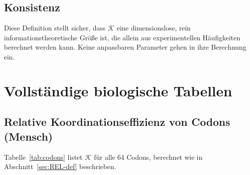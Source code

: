\documentclass[12pt,a4paper]{article}
\newcommand{\REL}{\mathcal{K}}          %
\begin{document}
	\subsection{Konsistenz}
	Diese Definition stellt sicher, dass \(\REL\) eine dimensionslose, rein informationstheoretische Größe ist, die allein aus experimentellen Häufigkeiten berechnet werden kann. Keine anpassbaren Parameter gehen in ihre Berechnung ein.
	
	\section{Vollständige biologische Tabellen}
	\label{sec:tables}
	
	\subsection{Relative Koordinationseffizienz von Codons (Mensch)}
	\label{sec:codons}
	Tabelle~\ref{tab:codons} listet \(\REL\) für alle 64 Codons, berechnet wie in Abschnitt~\ref{sec:REL-def} beschrieben.
	
\end{document}
